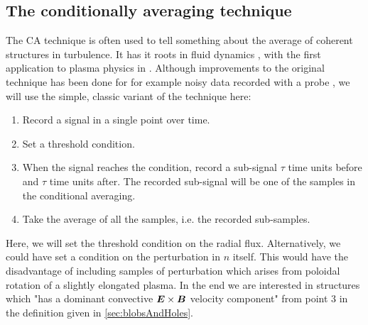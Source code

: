 \subsection{The conditionally averaging technique}
%
The CA technique is often used to tell something about the average of coherent structures in turbulence.
It has it roots in fluid dynamics \cite{Kovasznay1970}, with the first application to plasma physics in \cite{Huld1990}. Although improvements to the original technique has been done for for example noisy data recorded with a probe \cite{Teliban2007}, we will use the simple, classic variant of the technique here:
\newpage
%
\begin{algorithm}
\begin{enumerate}
    \item Record a signal in a single point over time.
    \item Set a threshold condition.
    \item When the signal reaches the condition, record a sub-signal $\tau$ time units before and $\tau$ time units after.
        The recorded sub-signal will be one of the samples in the conditional averaging.
    \item Take the average of all the samples, i.e. the recorded sub-samples.
\end{enumerate}
\end{algorithm}
%
Here, we will set the threshold condition on the radial flux.
Alternatively, we could have set a condition on the perturbation in $n$ itself.
This would have the disadvantage of including samples of perturbation which arises from poloidal rotation of a slightly elongated plasma.
In the end we are interested in structures which "has a dominant convective $\boldsymbol{E}\times\boldsymbol{B}$ velocity component" from point $3$ in the definition given in \cref{sec:blobsAndHoles}.

